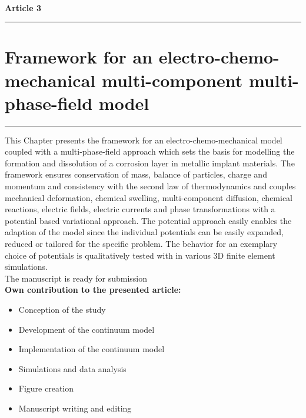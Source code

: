 \ \vspace{1cm} \\
{\Large \bf Article 3}
\normalsize
\vspace{0.3cm}
\hrule
\section*{\Large \centering Framework for an electro-chemo-mechanical multi-component multi-phase-field model}
\hrule
\vspace{1.5cm}

This Chapter presents the framework for an electro-chemo-mechanical model coupled with a multi-phase-field approach which sets the basis for modelling the formation and dissolution of a corrosion layer in metallic implant materials. The framework ensures conservation of mass, balance of particles, charge and momentum and consistency with the second law of thermodynamics and couples mechanical deformation, chemical swelling, multi-component diffusion, chemical reactions, electric fields, electric currents and phase transformations with a potential based variational approach. The potential approach easily enables the adaption of the model since the individual potentials can be easily expanded, reduced or tailored for the specific problem. The behavior for an exemplary choice of potentials is qualitatively tested with in various 3D finite element simulations.  \\

The manuscript is ready for submission \\

\textbf{Own contribution to the presented article:}
\begin{itemize}
\item Conception of the study
\item Development of the continuum model
\item Implementation of the continuum model
\item Simulations and data analysis
\item Figure creation 
\item Manuscript writing and editing
\end{itemize}